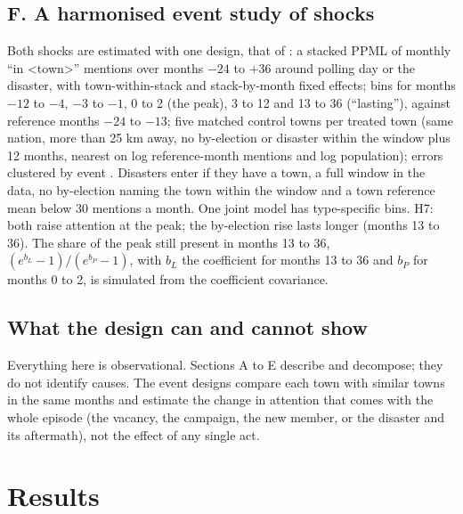 \documentclass[11pt,a4paper]{article}
\begin{document}
\subsection{F. A harmonised event study of shocks}
Both shocks are estimated with one design, that of \citet{hotham2026c}: a stacked PPML \citep{cengiz2019,correia2020} of monthly ``in <town>'' mentions over months $-24$ to $+36$ around polling day or the disaster, with town-within-stack and stack-by-month fixed effects; bins for months $-12$ to $-4$, $-3$ to $-1$, 0 to 2 (the peak), 3 to 12 and 13 to 36 (``lasting''), against reference months $-24$ to $-13$; five matched control towns per treated town (same nation, more than 25 km away, no by-election or disaster within the window plus 12 months, nearest on log reference-month mentions and log population); errors clustered by event \citep{cameronmiller2015,abadie2023}. Disasters enter if they have a town, a full window in the data, no by-election naming the town within the window and a town reference mean below 30 mentions a month. One joint model has type-specific bins. H7: both raise attention at the peak; the by-election rise lasts longer (months 13 to 36). The share of the peak still present in months 13 to 36, $(e^{b_{L}}-1)/(e^{b_{P}}-1)$, with $b_L$ the coefficient for months 13 to 36 and $b_P$ for months 0 to 2, is simulated from the coefficient covariance.

\subsection{What the design can and cannot show}
Everything here is observational. Sections A to E describe and decompose; they do not identify causes. The event designs compare each town with similar towns in the same months and estimate the change in attention that comes with the whole episode (the vacancy, the campaign, the new member, or the disaster and its aftermath), not the effect of any single act.

\section{Results}\label{sec:results}
\end{document}
